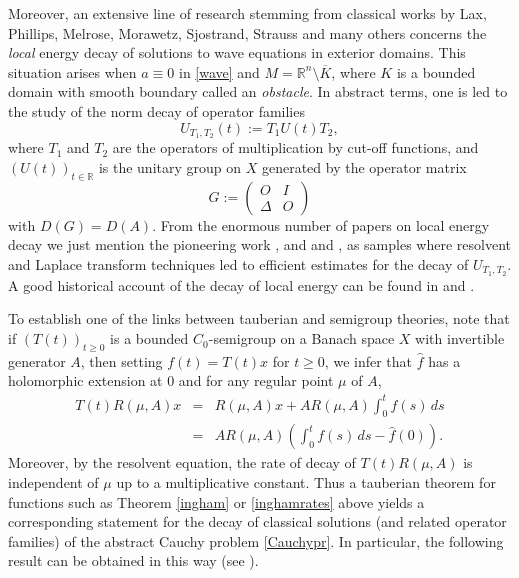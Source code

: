 \documentclass[11pt]{amsart}
\theoremstyle{definition}
\theoremstyle{remark}
\numberwithin{equation}{section}
\begin{document}
Moreover, an extensive line of research stemming from classical
works by Lax, Phillips, Melrose, Morawetz, Sjostrand, Strauss and
many others concerns the {\it local} energy decay of solutions to
wave equations in exterior domains. This situation arises when  $a
\equiv0$ in \eqref{wave} and $M={{\mathbb R}}^n \setminus \overline K$, where
$K$ is a bounded domain with smooth boundary called an {\it
obstacle}. In abstract terms, one is led to the study of the norm decay of
operator families
\begin{equation}\label{utt}
U_{T_1, T_2}(t):=T_1 U(t) T_2,
\end{equation}
where $T_1$  and $T_2$ are the operators of multiplication by cut-off functions,
and $(U(t))_{t \in \mathbb R}$ is the unitary group
on $X$ generated by the operator matrix
\begin{equation*}
G:= \begin{pmatrix} O & I\\
                   \Delta & O\end{pmatrix}
\end{equation*}
with $D(G)=D(A)$.  From the enormous number of papers on local
energy decay we just mention the pioneering work \cite{Bu98}, and
\cite{BoPe06} and \cite{Ch09}, as samples where resolvent and
Laplace transform techniques led to efficient estimates for the
decay of $U_{T_1, T_2}$.  A good historical account of the decay of
local energy can be found in \cite{Bu98} and \cite{Ch09}.

To establish one of the links between tauberian and semigroup theories,
note that if $(T(t))_{t \ge 0}$ is a bounded $C_0$-semigroup on a Banach space $X$
with invertible generator $A$,
then setting $f(t)=T(t)x$ for $t\ge 0$, we infer that $\widehat f$ has a holomorphic
extension at $0$ and for any regular point $\mu$ of $A$,
\begin{eqnarray*}
T(t)R(\mu, A)x&=&R(\mu, A)x + AR(\mu, A)\int_{0}^{t}f(s)\, ds\label{link}\\
&=&AR(\mu, A)\left(\int_{0}^{t}f(s)\, ds -\widehat f(0)\right).\nonumber
\end{eqnarray*}
Moreover, by the resolvent equation, the rate of decay of $T(t)R(\mu, A)$ is independent of $\mu$ up to a multiplicative constant.
Thus a tauberian theorem for functions such as Theorem \ref{ingham} or \ref{inghamrates} above yields a corresponding statement for the decay of classical solutions (and related operator families) of the abstract Cauchy problem \eqref{Cauchypr}.  In particular, the following result can be obtained in this way (see \cite[Theorem 4.4.14]{ABHN01}).
\end{document}
